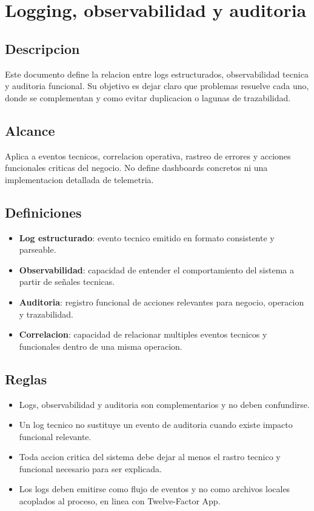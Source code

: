 \section{Logging, observabilidad y auditoria}

\subsection{Descripcion}

Este documento define la relacion entre logs estructurados, observabilidad tecnica y auditoria funcional. Su objetivo es dejar claro que problemas resuelve cada uno, donde se complementan y como evitar duplicacion o lagunas de trazabilidad.

\subsection{Alcance}

Aplica a eventos tecnicos, correlacion operativa, rastreo de errores y acciones funcionales criticas del negocio. No define dashboards concretos ni una implementacion detallada de telemetria.

\subsection{Definiciones}

\begin{itemize}
  \item \textbf{Log estructurado}: evento tecnico emitido en formato consistente y parseable.
  \item \textbf{Observabilidad}: capacidad de entender el comportamiento del sistema a partir de señales tecnicas.
  \item \textbf{Auditoria}: registro funcional de acciones relevantes para negocio, operacion y trazabilidad.
  \item \textbf{Correlacion}: capacidad de relacionar multiples eventos tecnicos y funcionales dentro de una misma operacion.
\end{itemize}

\subsection{Reglas}

\begin{itemize}
  \item Logs, observabilidad y auditoria son complementarios y no deben confundirse.
  \item Un log tecnico no sustituye un evento de auditoria cuando existe impacto funcional relevante.
  \item Toda accion critica del sistema debe dejar al menos el rastro tecnico y funcional necesario para ser explicada.
  \item Los logs deben emitirse como flujo de eventos y no como archivos locales acoplados al proceso, en linea con Twelve-Factor App.
\end{itemize}

